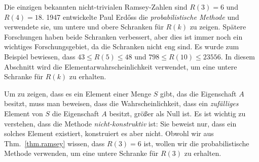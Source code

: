 Die einzigen bekannten nicht-trivialen Ramsey-Zahlen sind $R(3)=6$ und $R(4)=18$. 1947 entwickelte Paul Erd\H{o}ss die \emph{probabilistische Methode} und verwendete sie, um untere und obere Schranken für $R(k)$ zu zeigen. Spätere Forschungen haben beide Schranken verbessert, aber dies ist immer noch ein wichtiges Forschungsgebiet, da die Schranken nicht eng sind. Es wurde zum Beispiel bewiesen, dass $43\leq R(5) \leq 48$ und $798\leq R(10)\leq 23556$. In diesem Abschnitt wird die Elementarwahrscheinlichkeit verwendet, um eine untere Schranke für $R(k)$ zu erhalten.

Um zu zeigen, dass es ein Element einer Menge $S$ gibt, das die Eigenschaft $A$ besitzt, muss man beweisen, dass die Wahrscheinlichkeit, dass ein \emph{zufälliges} Element von $S$ die Eigenschaft $A$ besitzt, größer als Null ist. Es ist wichtig zu verstehen, dass die Methode \emph{nicht-konstruktiv} ist: Sie beweist nur, dass ein solches Element existiert, konstruiert es aber nicht. Obwohl wir aus Thm.~\ref{thm.ramsey} wissen, dass $R(3)=6$ ist, wollen wir die probabilistische Methode verwenden, um eine untere Schranke für $R(3)$ zu erhalten.

